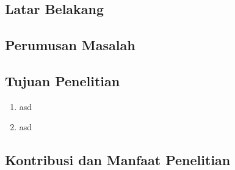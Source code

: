 \chapter{\babSatu}
\dummy 

\section{Latar Belakang}
\dummy

\dummy

\dummy

\section{Perumusan Masalah}
\dummy

\section{Tujuan Penelitian}
\dummy
\begin{enumerate}[noitemsep]
    \item asd
    \item asd
\end{enumerate}

\section{Kontribusi dan Manfaat Penelitian}
\dummy
